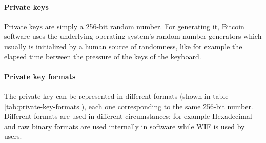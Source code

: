 \paragraph{Private keys}
Private keys are simply a 256-bit random number. For generating it, Bitcoin
software uses the underlying operating system’s random number generators which
usually is initialized by a human source of randomness, like for example the elapsed
time between the pressure of the keys of the keyboard.

\paragraph{Private key formats}
The private key can be represented in different formats (shown in table
\ref{tab:private-key-formats}), each one corresponding to the same 256-bit number.
Different formats are used in different circumstances: for example Hexadecimal
and raw binary formats are used internally in software while WIF is used by users.
\begin{table}[h!]
\centering
{}
\caption{Private key representation formats \cite{antonopoulos2017mastering}}
\label{tab:private-key-formats}
\end{table}

